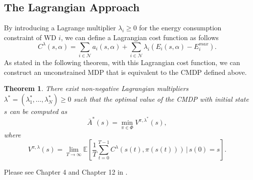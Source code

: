 \documentclass[lettersize, journal]{IEEEtran}
\newtheorem{theorem}{Theorem}
\begin{document}
\subsection{The Lagrangian Approach}
By introducing a Lagrange multiplier $\lambda_i \geq 0$ for the energy consumption constraint of WD $i$,
we can define a Lagrangian cost function as follows
\begin{equation}
    C^{\lambda}(s, \alpha) = \sum_{i\in\mathcal{N}} a_i(s,\alpha) + \sum_{i\in\mathcal{N}} \lambda_i \left( E_i(s,\alpha) - E^{max}_i \right).
    \label{eq:cost_function}
\end{equation}
As stated in the following theorem, with this Lagrangian cost function, we can construct an unconstrained MDP that is equivalent to the CMDP defined above.
\begin{theorem}%
    There exist non-negative Lagrangian multipliers $\lambda^* = (\lambda^*_1, \dots, \lambda^*_N) \geq 0$ such that
    the optimal value of the CMDP with initial state $s$ can be computed as
    \begin{equation*}
        \bar{A}^{*}(s) = \min_{\pi\in\Phi} V^{\pi, \lambda^*}(s),
    \end{equation*}
    where
    \begin{equation*}
        V^{\pi, \lambda}(s) = \lim_{T\to\infty} \mathbb{E} \left[ \frac{1}{T} \sum_{t=0}^{T-1} C^{\lambda}(s(t), \pi(s(t))) \, | \, s(0) = s \right].
    \end{equation*}
    \label{theorem:lagrange}
\end{theorem}
\begin{IEEEproof}
    Please see Chapter 4 and Chapter 12 in \cite{altman1999constrained}.
\end{IEEEproof}
\end{document}
